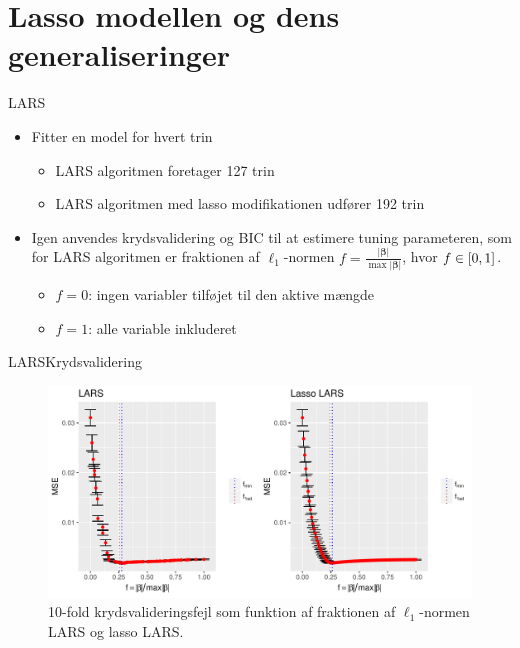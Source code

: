 \section{Lasso modellen og dens generaliseringer}
\begin{frame}{LARS}
\begin{itemize}
\item Fitter en model for hvert trin
\begin{itemize}
\item LARS algoritmen foretager 127 trin 
\item LARS algoritmen med lasso modifikationen udfører 192 trin 
\end{itemize}
\item Igen anvendes krydsvalidering og BIC til at estimere tuning parameteren, som for LARS algoritmen er fraktionen af \(\ell_1\)-normen \(f = \frac{\vert \boldsymbol{\beta} \vert}{\max \vert \boldsymbol{\beta} \vert}\), hvor \(f \in \sbr{0,1}\).
\begin{itemize}
\item \(f = 0\): ingen variabler tilføjet til den aktive mængde
\item \(f = 1\): alle variable inkluderet
\end{itemize}
\end{itemize}
\end{frame}


\begin{frame}{LARS}{Krydsvalidering}
\begin{figure}
 \includegraphics[width=1\linewidth, height=0.7\textheight]{slides/lars_kryds.pdf}
 \caption{10-fold krydsvalideringsfejl som funktion af fraktionen af \(\ell_1\)-normen LARS og lasso LARS.}
 \end{figure}
\end{frame}


